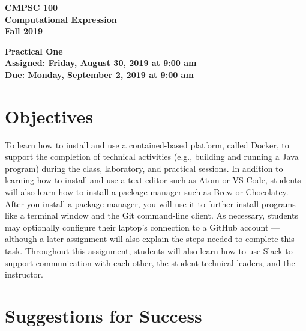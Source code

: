 \documentclass[11pt]{article}
\newcommand{\assignmentduedate}{September 2}
\newcommand{\assignmentassignedate}{August 30}
\newcommand{\assignmentnumber}{One}
\newcommand{\labyear}{2019}
\newcommand{\labdueday}{Monday}
\newcommand{\labassignday}{Friday}
\newcommand{\labtime}{9:00 am}
\newcommand{\assigneddate}{Assigned: \labassignday, \assignmentassignedate, \labyear{} at \labtime{}}
\newcommand{\duedate}{Due: \labdueday, \assignmentduedate, \labyear{} at \labtime{}}
\newcommand{\labtitle}[1]
{
  \begin{center}
    \begin{center}
      \bf
      CMPSC 100\\Computational Expression\\
      Fall 2019\\
      \medskip
    \end{center}
    \bf
    #1
  \end{center}
}
\begin{document}
\thispagestyle{empty}

\labtitle{Practical \assignmentnumber{} \\ \assigneddate{} \\ \duedate{}}



\section*{Objectives}

To learn how to install and use a contained-based platform, called Docker, to
support the completion of technical activities (e.g., building and running a
Java program) during the class, laboratory, and practical sessions. In addition
to learning how to install and use a text editor such as Atom or VS Code,
students will also learn how to install a package manager such as Brew or
Chocolatey. After you install a package manager, you will use it to further
install programs like a terminal window and the Git command-line client. As
necessary, students may optionally configure their laptop's connection to a
GitHub account --- although a later assignment will also explain the steps
needed to complete this task. Throughout this assignment, students will also
learn how to use Slack to support communication with each other, the student
technical leaders, and the instructor.

\section*{Suggestions for Success}
\end{document}
